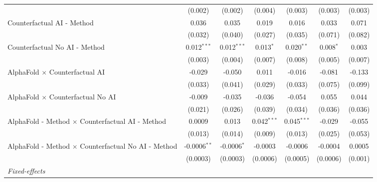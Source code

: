 \begin{tabular}{lcccccc}
                                                              & (0.002)        & (0.002)       & (0.004)       & (0.003)       & (0.003)     & (0.003)\\   
   Counterfactual AI - Method                                 & 0.036          & 0.035         & 0.019         & 0.016         & 0.033       & 0.071\\   
                                                              & (0.032)        & (0.040)       & (0.027)       & (0.035)       & (0.071)     & (0.082)\\   
   Counterfactual No AI - Method                              & 0.012$^{***}$  & 0.012$^{***}$ & 0.013$^{*}$   & 0.020$^{**}$  & 0.008$^{*}$ & 0.003\\   
                                                              & (0.003)        & (0.004)       & (0.007)       & (0.008)       & (0.005)     & (0.007)\\   
   AlphaFold $\times$ Counterfactual AI                       & -0.029         & -0.050        & 0.011         & -0.016        & -0.081      & -0.133\\   
                                                              & (0.033)        & (0.041)       & (0.029)       & (0.033)       & (0.075)     & (0.099)\\   
   AlphaFold $\times$ Counterfactual No AI                    & -0.009         & -0.035        & -0.036        & -0.054        & 0.055       & 0.044\\   
                                                              & (0.021)        & (0.026)       & (0.039)       & (0.034)       & (0.036)     & (0.036)\\   
   AlphaFold - Method $\times$ Counterfactual AI - Method     & 0.0009         & 0.013         & 0.042$^{***}$ & 0.045$^{***}$ & -0.029      & -0.055\\   
                                                              & (0.013)        & (0.014)       & (0.009)       & (0.013)       & (0.025)     & (0.053)\\   
   AlphaFold - Method $\times$ Counterfactual No AI - Method  & -0.0006$^{**}$ & -0.0006$^{*}$ & -0.0003       & -0.0006       & -0.0004     & 0.0005\\   
                                                              & (0.0003)       & (0.0003)      & (0.0006)      & (0.0005)      & (0.0006)    & (0.001)\\   
   \midrule
   \emph{Fixed-effects}\\

\end{tabular}
